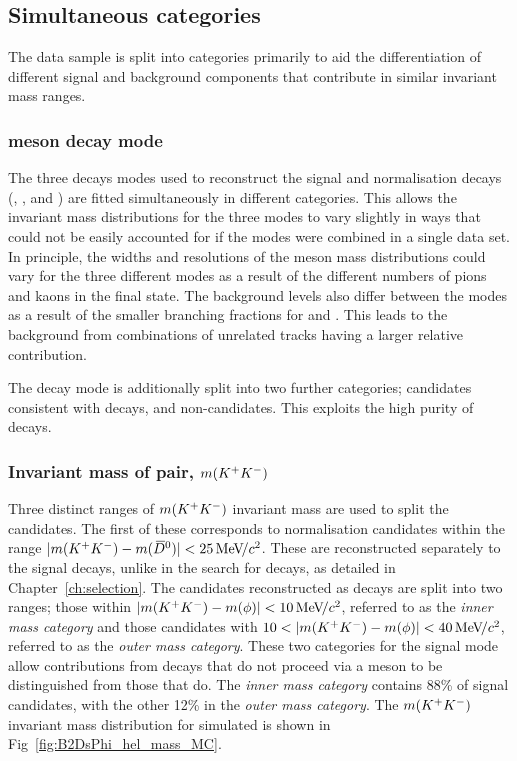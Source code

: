 \subsection{Simultaneous categories}
\label{sec:B2DsPhi_fit_cats}

The data sample is split into categories primarily to aid the differentiation of different signal and background components that contribute in similar invariant mass ranges.

\subsubsection{\Dsp meson decay mode} 
The three \Dsp decays modes used to reconstruct the signal and normalisation decays (\decay{\Dsp}{\Kp\Km\pip}, \decay{\Dsp}{\pip\pim\pip}, and \decay{\Dsp}{\Kp\pim\pip}) are fitted simultaneously in different categories. This allows the invariant mass distributions for the three modes to vary slightly in ways that could not be easily accounted for if the modes were combined in a single data set. In principle, the widths and resolutions of the \Bp meson mass distributions could vary for the three different modes as a result of the different numbers of pions and kaons in the final state. The background levels also differ between the modes as a result of the smaller branching fractions for \decay{\Dsp}{\pip\pim\pip} and \decay{\Dsp}{\Kp\pim\pip}. This leads to the background from combinations of unrelated tracks having a larger relative contribution.

The \decay{\Dsp}{\Kp\Km\pip} decay mode is additionally split into two further categories; candidates consistent with \decay{\Dsp}{\phiz\pip} decays, and non-\phiz candidates. This exploits the high purity of \decay{\Dsp}{\phiz\pip} decays. 

\subsubsection{Invariant mass of \Kp\Km pair, $m({{K}^+}{{K}^-})$} 
Three distinct ranges of $m({{K}^+}{{K}^-})$ invariant mass are used to split the candidates. The first of these corresponds to normalisation \decay{\Bp}{\Dsp\Dzb} candidates within the range $|m({{K}^+}{{K}^-})-m({{\kern 0.2em\overline{\kern -0.2em D}{}}{}^0})|<25 {\mathrm{\,Me\kern -0.1em V\!/}c^2}$. These are reconstructed separately to the signal decays, unlike in the search for \decay{\Bp}{\Dsp\Kp\Km} decays, as detailed in Chapter~\ref{ch:selection}. The candidates reconstructed as \decay{\Bp}{\Dsp\phiz} decays are split into two ranges; those within $|m({{K}^+}{{K}^-})-m(\phi)|<10{\mathrm{\,Me\kern -0.1em V\!/}c^2}$, referred to as the \emph{inner \phiz mass category} and those candidates with $10<|m(\Kp\Km)-m(\phiz)|<40\mevcc$, referred to as the \emph{outer \phiz mass category}. These two categories for the signal mode allow contributions from decays that do not proceed via a \phiz meson to be distinguished from those that do. The \emph{inner \phiz mass category} contains 88\% of signal \decay{\Bp}{\Dsp\phiz} candidates, with the other 12\% in the \emph{outer \phiz mass category}. The $m({{K}^+}{{K}^-})$ invariant mass distribution for simulated \decay{\Bp}{\Dsp\phiz} is shown in Fig~\ref{fig:B2DsPhi_hel_mass_MC}.



